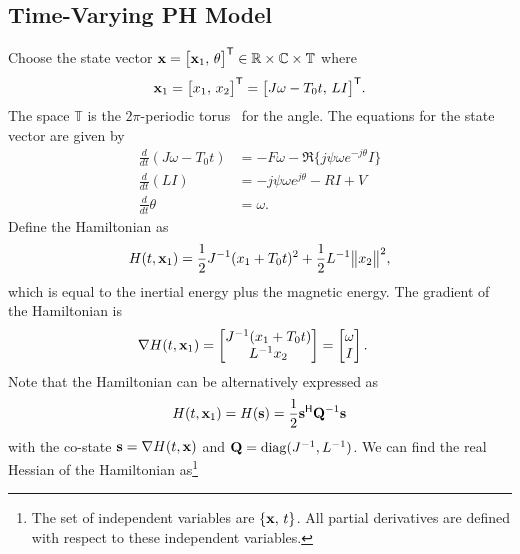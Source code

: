 \subsection{Time-Varying PH Model} 
Choose the state vector $\mathbf{x} = \big[ \mathbf{x}_1,\, \theta \big]^{\mathsf{T}} \in \mathbb{R} \times \mathbb{C} \times \mathbb{T}$ where
\begin{equation} \label{E:state}
    \mathbf{x}_1 = \big[ x_1,\, x_2 \big]^{\mathsf{T}} = \big[J \omega - T_0 t,\, L I \big]^{\mathsf{T}}.
\end{equation}
The space $\mathbb{T}$ is the $2\pi$-periodic torus~\cite{FB-ADL:04} for the angle. 
The equations for the state vector are given by
\begin{align}
    \frac{d}{dt} (J \omega - T_0 t) &= -F \omega - \Re\{j\psi \omega e^{-j\theta} I\} \label{E:sg_1} \\
    \frac{d}{dt} (L I) &= -j \psi \omega e^{j\theta} - R I + V \\
    \frac{d}{dt} \theta &= \omega. \label{E:sg_2} 
\end{align}
Define the Hamiltonian as
\begin{equation*}
    H(t, \vect x_1) = \frac{1}{2} J^{-1} (x_1 + T_0 t)^2 + \frac{1}{2} L^{-1} \big\|x_2 \big\|^2, %
\end{equation*}
which is equal to the inertial energy plus the magnetic energy.
The gradient of the Hamiltonian is
\begin{align}
    \nabla H(t, \mathbf{x}_1) &= \begin{bmatrix}
        J^{-1} (x_1 + T_0 t) \\
        L^{-1} x_2
    \end{bmatrix} = \begin{bmatrix}
        \omega \\
        I
    \end{bmatrix}. \label{E:gradient}
\end{align}
Note that the Hamiltonian can be alternatively expressed as
\begin{equation*}
    H(t, \mathbf{x}_1) = H(\mathbf{s}) = \frac{1}{2} \mathbf{s}^{\mathsf{H}} \mathbf{Q}^{-1} \mathbf{s}
\end{equation*}
with the co-state $\mathbf{s} = \nabla H(t, \mathbf{x})$ and $\mathbf{Q} = \mathrm{diag}(J^{-1}, L^{-1})$. We can find the real Hessian of the Hamiltonian as\footnote{The set of independent variables are $\{\mathbf{x},\,  t\}$. All partial derivatives are defined with respect to these independent variables.}
